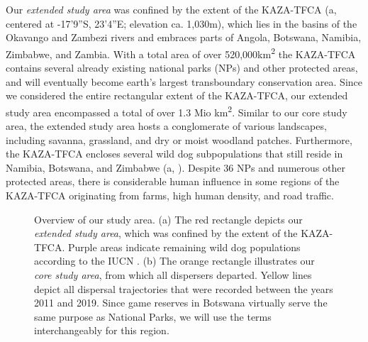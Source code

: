 \documentclass[abstract=on,10pt,a4paper,bibliography=totocnumbered]{scrartcl}
\begin{document}
Our \textit{extended study area} was confined by the extent of the KAZA-TFCA
(a, centered at -17'9''S, 23'4''E; elevation
ca. 1,030m), which lies in the basins of the Okavango and Zambezi rivers and
embraces parts of Angola, Botswana, Namibia, Zimbabwe, and Zambia. With a total
area of over 520,000km\textsuperscript{2} the KAZA-TFCA contains several already
existing national parks (NPs) and other protected areas, and will eventually
become earth's largest transboundary conservation area. Since we considered the
entire rectangular extent of the KAZA-TFCA, our extended study area encompassed
a total of over 1.3 Mio km\textsuperscript{2}. Similar to our core study area,
the extended study area hosts a conglomerate of various landscapes, including
savanna, grassland, and dry or moist woodland patches. Furthermore, the
KAZA-TFCA encloses several wild dog subpopulations  that still reside in
Namibia, Botswana, and Zimbabwe (a, \cite{Woodroffe.2012}).
Despite 36 NPs and numerous other protected areas, there is considerable human
influence in some regions of the KAZA-TFCA originating from farms, high human
density, and road traffic.

\begin{figure}[h]
  \begin{center}
    \caption{Overview of our study area. (a) The red rectangle depicts our
    \textit{extended study area}, which was confined by the extent of the
    KAZA-TFCA. Purple areas indicate remaining wild dog populations according to
    the IUCN \citep{Woodroffe.2012}. (b) The orange rectangle illustrates our
    \textit{core study area}, from which all dispersers departed. Yellow lines
    depict all dispersal trajectories that were recorded between the years 2011
    and 2019. Since game reserves in Botswana virtually serve the same purpose as
    National Parks, we will use the terms interchangeably for this region.}
    \label{StudyArea}
  \end{center}
\end{figure}
\end{document}
